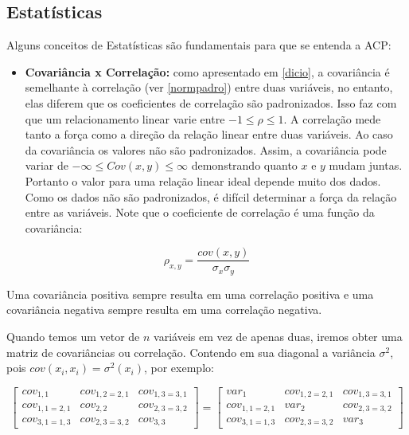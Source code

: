 \documentclass[
]{book}
\providecommand{\tightlist}{%
  \setlength{\itemsep}{0pt}\setlength{\parskip}{0pt}}
\begin{document}
\hypertarget{estatuxedsticas}{%
\subsection{Estatísticas}\label{estatuxedsticas}}

Alguns conceitos de Estatísticas são fundamentais para que se entenda a ACP:

\begin{itemize}
\tightlist
\item
  \textbf{Covariância x Correlação:} como apresentado em \ref{dicio}, a covariância é semelhante à correlação (ver \ref{normpadro}) entre duas variáveis, no entanto, elas diferem que os coeficientes de correlação são padronizados. Isso faz com que um relacionamento linear varie entre \(-1 \leq \rho \leq 1\). A correlação mede tanto a força como a direção da relação linear entre duas variáveis. Ao caso da covariância os valores não são padronizados. Assim, a covariância pode variar de \(-\infty \leq Cov (x,y) \leq \infty\) demonstrando quanto \(x\) e \(y\) mudam juntas. Portanto o valor para uma relação linear ideal depende muito dos dados. Como os dados não são padronizados, é difícil determinar a força da relação entre as variáveis. Note que o coeficiente de correlação é uma função da covariância:
\end{itemize}

\[\rho_{x,y}=\frac{cov(x,y)}{\sigma_x \sigma_y}\]

Uma covariância positiva sempre resulta em uma correlação positiva e uma covariância negativa sempre resulta em uma correlação negativa.

Quando temos um vetor de \(n\) variáveis em vez de apenas duas, iremos obter uma matriz de covariâncias ou correlação. Contendo em sua diagonal a variância \(\sigma^2\), pois \(cov(x_i,x_i)=\sigma^2(x_i)\), por exemplo:

\[\begin{bmatrix}
cov_{1,1} &cov_{1,2=2,1}  &cov_{1,3=3,1} \\ 
cov_{1,1=2,1} &cov_{2,2}  &cov_{2,3=3,2} \\ 
cov_{3,1=1,3} &cov_{2,3=3,2} & cov_{3,3}
\end{bmatrix} = \begin{bmatrix}
var_{1} &cov_{1,2=2,1}  &cov_{1,3=3,1} \\ 
cov_{1,1=2,1} &var_{2}  &cov_{2,3=3,2} \\ 
cov_{3,1=1,3} &cov_{2,3=3,2} & var_{3}
\end{bmatrix}\]
\end{document}
